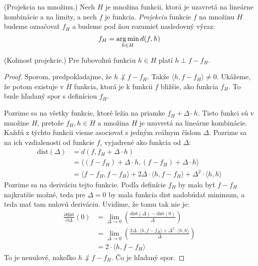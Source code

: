 \begin{definition}
  (Projekcia na množinu.) Nech $H$ je množina funkcii, ktorá je uzavretá
  na lineárne kombinácie a na limity, a nech $f$ je funkcia.
  \emph{Projekciu} funkcie $f$ na množinu $H$ budeme označovať $f_H$
  a budeme pod ňou rozumieť nasledovný výraz:
  $$f_H = \operatorname*{arg\,min}_{h \in H} d(f, h)$$
\end{definition}

\begin{lemma}
  (Kolmosť projekcie.) Pre ľubovoľnú funkciu $h \in H$ platí $h \perp f - f_H$.
\end{lemma}
\begin{proof}
  Sporom, predpokladajme, že $h \not\perp f - f_H$. Takže
  $\langle h, f - f_H \rangle \neq 0$. Ukážeme, že potom existuje
  v $H$ funkcia, ktorá je k funkcii $f$ bližšie, ako funkcia $f_H$.
  To bude hľadaný spor s definíciou $f_H$.
  
  Pozrime sa na všetky funkcie, ktoré ležia na priamke
  $f_H + \Delta \cdot h$. Tieto funkci sú v množine $H$, pretože
  $f_H, h \in H$ a množina $H$ je uzavretá na lineárne kombinácie.
  Každú z týchto funkcii vieme asociovať s jedným reálnym číslom
  $\Delta$. Pozrime sa na ich vzdialenosti od funkcie $f$, vyjadrené
  ako funkcia od $\Delta$:
  \begin{align}
    \text{dist}(\Delta)
      &= d(f, f_H + \Delta \cdot h) \\
      &= \langle (f - f_H) + \Delta \cdot h, (f - f_H) + \Delta \cdot h \rangle \\
      &= \langle f - f_H, f - f_H \rangle + 2\Delta \cdot \langle h, f - f_H \rangle + \Delta^2 \cdot \langle h, h \rangle
  \end{align}
  Pozrime sa na deriváciu tejto funkcie. Podľa definície $f_H$ by
  malo byť $f - f_H$ najkratšie možné, teda pre $\Delta = 0$ by mala
  funkcia $\text{dist}$ nadobúdať minimum, a teda mať tam nulovú
  deriváciu. Uvidíme, že tomu tak nie je:
  \begin{align}
    \frac{\partial \text{dist}}{\partial \Delta} \left( 0 \right)
      &= \lim_{\Delta \to 0} \left( \frac{\text{dist}(\Delta) - \text{dist}(0)}{\Delta} \right) \\
      &= \lim_{\Delta \to 0} \left( \frac{2\Delta \cdot \langle h, f - f_H \rangle + \Delta^2 \cdot \langle h, h \rangle}{\Delta} \right) \\
      &= 2 \cdot \langle h, f - f_H \rangle
  \end{align}
  To je nenulové, nakoľko $h \not \perp f - f_H$. Čo je hľadaný spor.
\end{proof}

